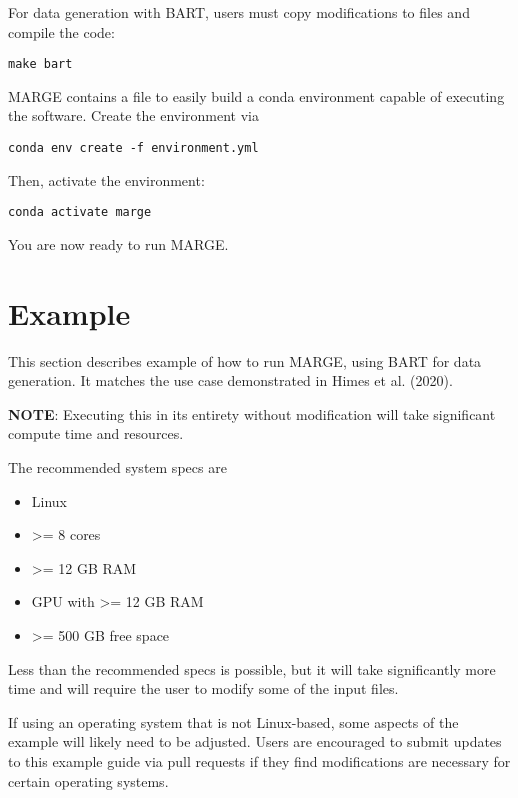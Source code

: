 \documentclass[letterpaper, 12pt]{article}
\begin{document}
\noindent For data generation with BART, users must copy modifications to files
and compile the code:

\begin{verbatim}
make bart
\end{verbatim}

\noindent MARGE contains a file to easily build a conda environment capable of 
executing the software.  Create the environment via

\begin{verbatim}
conda env create -f environment.yml
\end{verbatim}

\noindent Then, activate the environment:

\begin{verbatim}
conda activate marge
\end{verbatim}

\noindent You are now ready to run MARGE.


\section{Example}
\label{sec:example}

This section describes example of how to run MARGE, using BART for data 
generation. It matches the use case demonstrated in Himes et al. (2020).

\noindent \textbf{NOTE}: Executing this in its entirety without modification 
will take significant compute time and resources.

\noindent The recommended system specs are
\begin{itemize}
\item Linux
\item {\textgreater}= 8 cores
\item {\textgreater}= 12 GB RAM
\item GPU with {\textgreater}= 12 GB RAM
\item {\textgreater}= 500 GB free space
\end{itemize}

\noindent Less than the recommended specs is possible, but it will take 
significantly more time and will require the user to modify some of the 
input files.\newline

\noindent If using an operating system that is not Linux-based, some aspects 
of the example will likely need to be adjusted.  Users are encouraged to submit 
updates to this example guide via pull requests if they find modifications are 
necessary for certain operating systems.\newline
\end{document}
